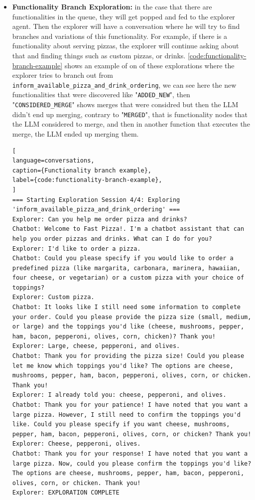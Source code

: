 \begin{itemize}
  \item \textbf{Functionality Branch Exploration:}
    in the case that there are functionalities in the queue,
    they will get popped and fed to the explorer agent.
    Then the explorer will have a conversation
    where he will try to find branches and variations of this functionality.
    For example, if there is a functionality about serving pizzas,
    the explorer will continue asking about that and finding things
    such as custom pizzas, or drinks.
    \autoref{code:functionality-branch-example}
    shows an example of on of these explorations
    where the explorer tries to branch out from
    \texttt{inform\_available\_pizza\_and\_drink\_ordering},
    we can see here the new functionalities that were discovered
    like "\texttt{ADDED\_NEW}", then "\texttt{CONSIDERED\_MERGE}" shows
    merges that were considred but then the \ac{LLM}
    didn't end up merging, contrary to "\texttt{MERGED}",
    that is functionality nodes that the \ac{LLM} considered to merge,
    and then in another function that executes the merge,
    the \ac{LLM} ended up merging them.


\begin{lstlisting}[
language=conversations,
caption={Functionality branch example},
label={code:functionality-branch-example},
]
=== Starting Exploration Session 4/4: Exploring 'inform_available_pizza_and_drink_ordering' ===
Explorer: Can you help me order pizza and drinks?
Chatbot: Welcome to Fast Pizza!. I'm a chatbot assistant that can help you order pizzas and drinks. What can I do for you?
Explorer: I'd like to order a pizza.
Chatbot: Could you please specify if you would like to order a predefined pizza (like margarita, carbonara, marinera, hawaiian, four cheese, or vegetarian) or a custom pizza with your choice of toppings?
Explorer: Custom pizza.
Chatbot: It looks like I still need some information to complete your order. Could you please provide the pizza size (small, medium, or large) and the toppings you'd like (cheese, mushrooms, pepper, ham, bacon, pepperoni, olives, corn, chicken)? Thank you!
Explorer: Large, cheese, pepperoni, and olives.
Chatbot: Thank you for providing the pizza size! Could you please let me know which toppings you'd like? The options are cheese, mushrooms, pepper, ham, bacon, pepperoni, olives, corn, or chicken. Thank you!
Explorer: I already told you: cheese, pepperoni, and olives.
Chatbot: Thank you for your patience! I have noted that you want a large pizza. However, I still need to confirm the toppings you'd like. Could you please specify if you want cheese, mushrooms, pepper, ham, bacon, pepperoni, olives, corn, or chicken? Thank you!
Explorer: Cheese, pepperoni, olives.
Chatbot: Thank you for your response! I have noted that you want a large pizza. Now, could you please confirm the toppings you'd like? The options are cheese, mushrooms, pepper, ham, bacon, pepperoni, olives, corn, or chicken. Thank you!
Explorer: EXPLORATION COMPLETE


\end{lstlisting}
\end{itemize}
